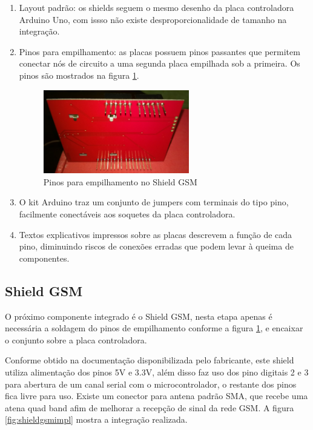 \begin{enumerate}
	\item Layout padrão: os shields seguem o mesmo desenho da placa controladora Arduino Uno, com issso não existe desproporcionalidade de tamanho na integração.
	\item Pinos para empilhamento: as placas possuem pinos passantes que permitem conectar nós de circuito a uma segunda placa empilhada sob a primeira. Os pinos são mostrados na figura \ref{fig:empilpin}.
	
\begin{figure}[!htb]
	\centering
	\includegraphics[width=0.6\textwidth]{figures/stackPins.jpg}
	\caption{Pinos para empilhamento no Shield GSM}
	\label{fig:empilpin}
\end{figure}	

	\item O kit Arduino traz um conjunto de jumpers com terminais do tipo pino, facilmente conectáveis aos soquetes da placa controladora.
	\item Textos explicativos impressos sobre as placas descrevem a função de cada pino, diminuindo riscos de conexões erradas que podem levar à queima de componentes.
	
\end{enumerate}

\subsection{Shield GSM}

O próximo componente integrado é o Shield GSM, nesta etapa apenas é necessária a soldagem do pinos de empilhamento conforme a figura \ref{fig:empilpin}, e encaixar o conjunto sobre a placa controladora.

Conforme obtido na documentação disponibilizada pelo fabricante, este shield utiliza alimentação dos pinos 5V e 3.3V, além disso faz uso dos pino digitais 2 e 3 para abertura de um canal serial com o microcontrolador, o restante dos pinos fica livre para uso. Existe um conector para antena padrão SMA, que recebe uma atena quad band afim de melhorar a recepção de sinal da rede GSM. A figura \ref{fig:shieldgsmimpl} mostra a integração realizada.
 
